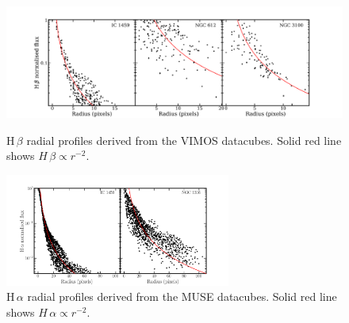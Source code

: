 		\begin{figure}
			\centering
			\includegraphics[width=\textwidth]{chapter5/vimos/Hbeta_profile.png}
			\caption[VIMOS H\,$\beta$ radial profiles]{H\,$\beta$ radial profiles derived from the VIMOS datacubes. Solid red line shows $H\,\beta \propto r^{-2}$.\label{fig:Hb_profile_VIMOS}} 
			

			\includegraphics[width=0.66\textwidth]{chapter5/muse/Halpha_profile.png}
			\caption[MUSE H\,$\alpha$ radial profiles]{H\,$\alpha$ radial profiles derived from the MUSE datacubes. Solid red line shows $H\,\alpha \propto r^{-2}$.\label{fig:Ha_profile_MUSE}} 
			
		\end{figure}
		
